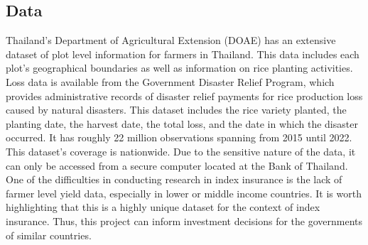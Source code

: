\documentclass[12pt]{article}
\begin{document}



  \subsection{Data}
  Thailand's Department of Agricultural Extension (DOAE) has an extensive dataset of plot level information for farmers in Thailand. This data includes each plot's geographical boundaries as well as information on rice planting activities. Loss data is available from the Government Disaster Relief Program, which provides administrative records of disaster relief payments for rice production loss caused by natural disasters. This dataset includes the rice variety planted, the planting date, the harvest date, the total loss, and the date in which the disaster occurred. It has roughly 22 million observations spanning from 2015 until 2022. This dataset's coverage is nationwide. Due to the sensitive nature of the data, it can only be accessed from a secure computer located at the Bank of Thailand. One of the difficulties in conducting research in index insurance is the lack of farmer level yield data, especially in lower or middle income countries. It is worth highlighting that this is a highly unique dataset for the context of index insurance. Thus, this project can inform investment decisions for the governments of similar countries. 
\end{document}
